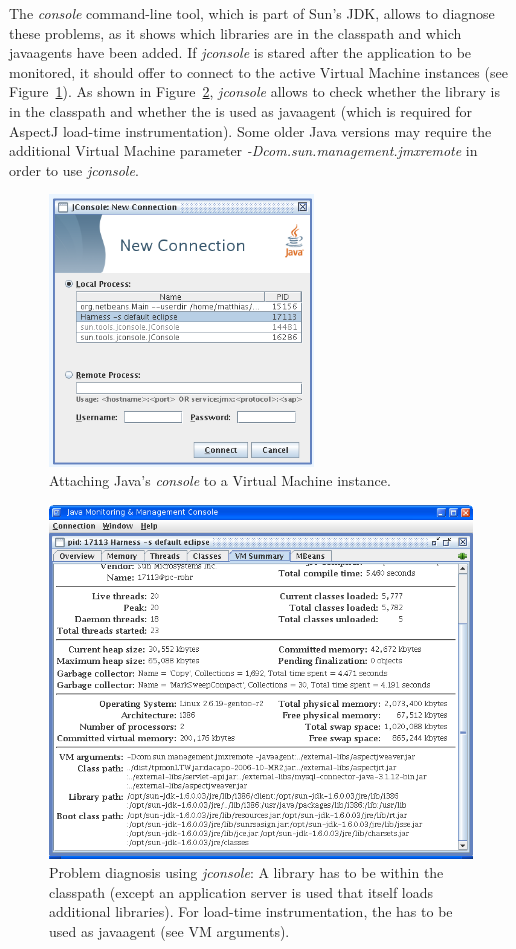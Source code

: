 \documentclass[a4paper,12pt]{scrartcl}
\begin{document}
The \textit{console} command-line tool, which is part of Sun's JDK, allows to diagnose these problems, as it shows which libraries are in the classpath and which javaagents have been added. If \textit{jconsole} is stared after the application to be monitored, it should offer to connect to the active Virtual Machine instances (see Figure~\ref{jconsolestartup}). As shown in Figure~\ref{jconsole}, \textit{jconsole} allows to check whether the \tpmon{} library is in the classpath and whether the \aspectjweaverjar{} is used as javaagent (which is required for AspectJ load-time instrumentation). Some older Java versions may require the additional Virtual Machine parameter \textit{-Dcom.sun.management.jmxremote} in order to use \textit{jconsole}.

\begin{figure}
 \centering
 \includegraphics[width=7cm]{snapshot4b.png}
 \caption{Attaching Java's \textit{console} to a Virtual Machine instance.}
 \label{jconsolestartup}
\end{figure}

\begin{figure}
 \centering
 \includegraphics[width=12cm]{snapshot5.png}
 \caption{Problem diagnosis using \textit{jconsole}: A \tpmon{} library has to be within the classpath (except an application server is used that itself loads additional libraries). For load-time instrumentation, the \aspectjweaverjar{} has to be used as javaagent (see VM arguments).}\label{jconsole}
\end{figure}
\end{document}
